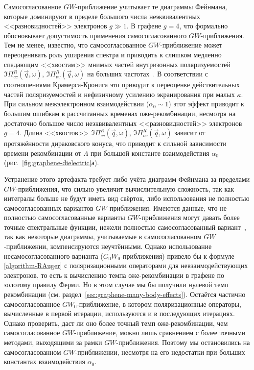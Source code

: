 Самосогласованное $GW$-приближение учитывает те диаграммы Фейнмана, которые доминируют в пределе большого числа неэквивалентных <<разновидностей>> электронов $g \gg 1$. В графене $g = 4$, что формально обосновывает допустимость применения самосогласованного $GW$-приближения. Тем не менее, известно, что самосогласованное $GW$-приближение может переоценивать роль уширения спектра и приводить к слишком медленно спадающим <<хвостам>> мнимых частей внутризонных поляризуемостей $\Im\Pi^{R}_{cc}(\vec{q},\omega)$, $\Im\Pi^{R}_{vv}(\vec{q},\omega)$ на больших частотах~\cite{GW_sum_rules_violation}. В соответствии с соотношениями Крамерса-Кронига это приводит к переоценке действительных частей поляризуемостей и нефизичному усилению экранирования при малых $\kappa$. При сильном межэлектронном взаимодействии ($\alpha_0 \sim 1$) этот эффект приводит к большим ошибкам в рассчитанных временах оже-рекомбинации, несмотря на достаточно большое число неэквивалентных <<разновидностей>> электронов $g = 4$. Длина <<хвостов>> $\Im\Pi^{R}_{cc}(\vec{q},\omega)$, $\Im\Pi^{R}_{vv}(\vec{q},\omega)$ зависит от протяжённости дираковского конуса, что приводит к сильной зависимости времени рекомбинации от $\Lambda$ при большой константе взаимодействия $\alpha_0$ (рис.~\ref{fig:graphene-dielectric}а).

Устранение этого артефакта требует либо учёта диаграмм Фейнмана за пределами $GW$-приближения, что сильно увеличит вычислительную сложность, так как интегралы больше не будут иметь вид свёрток, либо использования не полностью самосогласованных вариантов $GW$-приближения. Имеются данные, что не полностью самосогласованные варианты $GW$-приближения могут давать более точные спектральные функции, нежели полностью самосогласованный вариант~\cite{GW_sum_rules_violation}, так как некоторые диаграммы, учитываемые в самосогласованном $GW$-приближении, компенсируются неучтёнными. Однако использование несамосогласованного варианта ($G_0 W_0$-приближения) привело бы к формуле \eqref{algorithm-RAuger} с поляризационными операторами для невзаимодействующих электронов, то есть к вычислению темпа оже-рекомбинации в графене по золотому правилу Ферми. Но в этом случае мы бы получили нулевой темп рекомбинации (см. раздел~\ref{sec:graphene-many-body-effects}). Остаётся частично самосогласованное $G W_0$-приближение, в котором поляризационные операторы, вычисленные в первой итерации, используются и в последующих итерациях. Однако проверить, даст ли оно более точный темп оже-рекомбинации, чем самосогласованное $GW$-приближение, можно лишь сравнением с более точными методами, выходящими за рамки $GW$-приближения. Поэтому мы остановились на самосогласованном $GW$-приближении, несмотря на его недостатки при больших константах взаимодействия $\alpha_0$.


